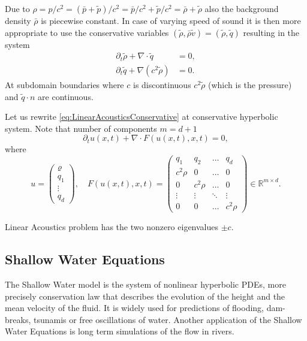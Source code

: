 \documentclass[a4paper,12pt]{article}
\theoremstyle{definition}
\theoremstyle{definition}
\newcommand{\Dim}{d}
\begin{document}
Due to $\rho = p/c^2 = (\bar{p} + \tilde{p})/c^2 = \bar{p}/c^2 +\tilde{p}/c^2 = \bar\rho + \tilde\rho$
also the background density $\bar\rho$ is piecewise constant. In case of varying speed of sound
it is then more appropriate to use the conservative variables $(\tilde\rho, \bar{\rho} \tilde{v}) = (\tilde\rho,\tilde{q})$
resulting in the system
\begin{subequations}\label{eq:LinearAcousticsConservative}
	\begin{align}
	\partial_t \tilde{\rho} +  \nabla\cdot\tilde{q} &= 0,\\
	\partial_t \tilde{q} + \nabla (c^2\tilde{\rho}) &= 0.
	\end{align}
\end{subequations}
At subdomain boundaries where $c$ is discontinuous $c^2\tilde\rho$
(which is the pressure) and $\tilde{q}\cdot n$ are continuous.

Let us rewrite \eqref{eq:LinearAcousticsConservative} at conservative hyperbolic system. Note that number of components $m=\Dim+1$
$$\partial_t u(x,t) + \nabla\cdot F(u(x,t),x,t) = 0,$$
where 
$$u = \begin{pmatrix}
\varrho\\
q_1\\
\vdots\\
q_\Dim
\end{pmatrix} ,\quad
F(u(x,t),x,t) = \left( \begin{matrix}
q_1  & q_2 & \dots & q_{\Dim}\\
c^2\rho & 0 & \dots & 0\\
0 & c^2\rho & \dots & 0\\
\vdots & \vdots & \ddots & \vdots\\
0 & 0 & \dots & c^2\rho 
\end{matrix} \right)\in \mathbb{R}^{m\times \Dim} .$$

Linear Acoustics problem has the two nonzero eigenvalues $\pm c$.


\subsection{Shallow Water Equations}
The Shallow Water model is the system of nonlinear hyperbolic PDEs, more precisely conservation law that describes the evolution of the height and the mean velocity of the fluid. It is widely used for predictions of flooding, dam-breaks, tsunamis or free oscillations of water. Another application of the Shallow Water Equations is long term simulations of the flow in rivers.
\end{document}
